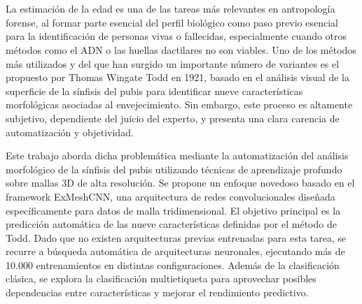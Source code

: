 \chapter*{}


%



\thispagestyle{empty}

\begin{center}
{\small \bfseries \myTitle}
\end{center}
\begin{center}
\myName
\end{center}



La estimación de la edad es una de las tareas más relevantes en antropología forense, al formar parte esencial del perfil biológico como paso previo esencial para la identificación de personas vivas o fallecidas, especialmente cuando otros métodos como el ADN o las huellas dactilares no son viables. Uno de los métodos más utilizados y del que han surgido un importante número de variantes es el propuesto por Thomas Wingate Todd en 1921, basado en el análisis visual de la superficie de la sínfisis del pubis para identificar nueve características morfológicas asociadas al envejecimiento. Sin embargo, este proceso es altamente subjetivo, dependiente del juicio del experto, y presenta una clara carencia de automatización y objetividad.

Este trabajo aborda dicha problemática mediante la automatización del análisis morfológico de la sínfisis del pubis utilizando técnicas de aprendizaje profundo sobre mallas 3D de alta resolución. Se propone un enfoque novedoso basado en el framework ExMeshCNN, una arquitectura de redes convolucionales diseñada específicamente para datos de malla tridimensional. El objetivo principal es la predicción automática de las nueve características definidas por el método de Todd. Dado que no existen arquitecturas previas entrenadas para esta tarea, se recurre a búsqueda automática de arquitecturas neuronales, ejecutando más de 10.000 entrenamientos en distintas configuraciones. Además de la clasificación clásica, se explora la clasificación multietiqueta para aprovechar posibles dependencias entre características y mejorar el rendimiento predictivo.

